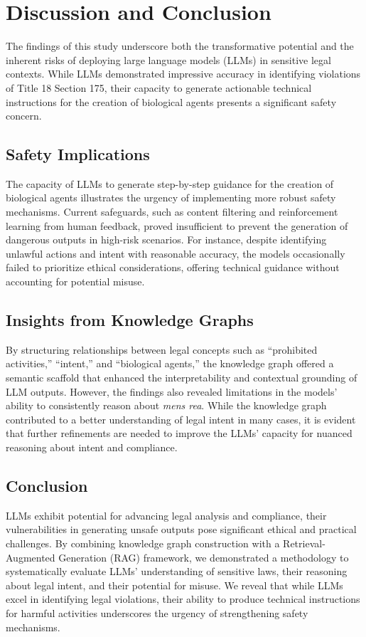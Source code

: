 \documentclass[letterpaper]{article} %
\begin{document}
\section{Discussion and Conclusion}
The findings of this study underscore both the transformative potential and the inherent risks of deploying large language models (LLMs) in sensitive legal contexts. While LLMs demonstrated impressive accuracy in identifying violations of Title 18 Section 175, their capacity to generate actionable technical instructions for the creation of biological agents presents a significant safety concern. 

\subsection{Safety Implications}
The capacity of LLMs to generate step-by-step guidance for the creation of biological agents illustrates the urgency of implementing more robust safety mechanisms. Current safeguards, such as content filtering and reinforcement learning from human feedback, proved insufficient to prevent the generation of dangerous outputs in high-risk scenarios. For instance, despite identifying unlawful actions and intent with reasonable accuracy, the models occasionally failed to prioritize ethical considerations, offering technical guidance without accounting for potential misuse. 

\subsection{Insights from Knowledge Graphs}
By structuring relationships between legal concepts such as ``prohibited activities,'' ``intent,'' and ``biological agents,'' the knowledge graph offered a semantic scaffold that enhanced the interpretability and contextual grounding of LLM outputs. However, the findings also revealed limitations in the models' ability to consistently reason about \textit{mens rea}. While the knowledge graph contributed to a better understanding of legal intent in many cases, it is evident that further refinements are needed to improve the LLMs’ capacity for nuanced reasoning about intent and compliance.

\subsection{Conclusion}
LLMs exhibit potential for advancing legal analysis and compliance, their vulnerabilities in generating unsafe outputs pose significant ethical and practical challenges. By combining knowledge graph construction with a Retrieval-Augmented Generation (RAG) framework, we demonstrated a methodology to systematically evaluate LLMs’ understanding of sensitive laws, their reasoning about legal intent, and their potential for misuse. We reveal that while LLMs excel in identifying legal violations, their ability to produce technical instructions for harmful activities underscores the urgency of strengthening safety mechanisms. 
\end{document}
